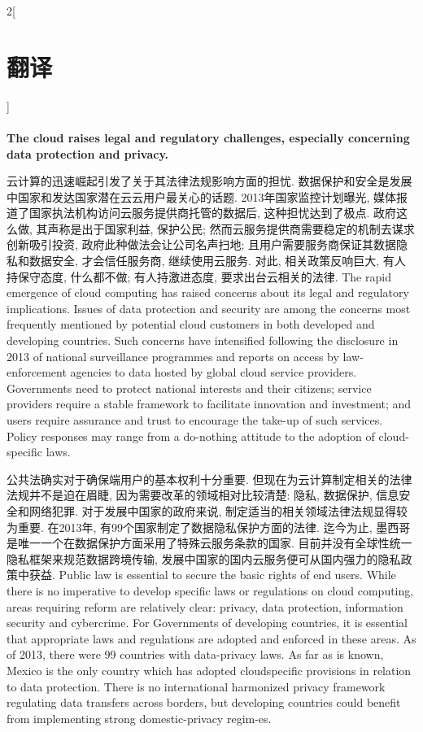 \documentclass[a4paper, UTF8, 12pt]{article}
\begin{document}
\begin{paracol}{2}[\section{翻译}]
    \paragraph{}
    {\bfseries The cloud raises legal and regulatory challenges, especially concerning data protection and privacy.}

    \switchcolumn*
    云计算的迅速崛起引发了关于其法律法规影响方面的担忧. 数据保护和安全是发展中国家和发达国家潜在云云用户最关心的话题. 2013年国家监控计划曝光, 媒体报道了国家执法机构访问云服务提供商托管的数据后, 这种担忧达到了极点. 政府这么做, 其声称是出于国家利益, 保护公民; 然而云服务提供商需要稳定的机制去谋求创新吸引投资, 政府此种做法会让公司名声扫地; 且用户需要服务商保证其数据隐私和数据安全, 才会信任服务商, 继续使用云服务. 对此, 相关政策反响巨大, 有人持保守态度, 什么都不做; 有人持激进态度, 要求出台云相关的法律.
    \switchcolumn
    \hypertarget{par:02}{}
    The rapid emergence of cloud computing has raised concerns about its legal and regulatory implications. Issues of data protection and security are among the concerns most frequently mentioned by potential cloud customers in both developed and developing countries. Such concerns have intensified following the disclosure in 2013 of national surveillance programmes and reports on access by law-enforcement agencies to data hosted by global cloud service providers. Governments need to protect national interests and their citizens; service providers require a stable framework to facilitate innovation and investment; and users require assurance and trust to encourage the take-up of such services. Policy responses may range from a do-nothing attitude to the adoption of cloud-specific laws. 

    \switchcolumn*
    公共法确实对于确保端用户的基本权利十分重要. 但现在为云计算制定相关的法律法规并不是迫在眉睫, 因为需要改革的领域相对比较清楚: 隐私, 数据保护, 信息安全和网络犯罪. 对于发展中国家的政府来说, 制定适当的相关领域法律法规显得较为重要. 在2013年, 有99个国家制定了数据隐私保护方面的法律. 迄今为止, 墨西哥是唯一一个在数据保护方面采用了特殊云服务条款的国家. 目前并没有全球性统一隐私框架来规范数据跨境传输, 发展中国家的国内云服务便可从国内强力的隐私政策中获益.
    \switchcolumn
    \hypertarget{par:03}{}
    Public law is essential to secure the basic rights of end users. While there is no imperative to develop specific laws or regulations on cloud computing, areas requiring reform are relatively clear: privacy, data protection, information security and cybercrime. For Governments of developing countries, it is essential that appropriate laws and regulations are adopted and enforced in these areas. As of 2013, there were 99 countries with data-privacy laws. As far as is known, Mexico is the only country which has adopted cloudspecific provisions in relation to data protection. There is no international harmonized privacy framework regulating data transfers across borders, but developing countries could benefit from implementing strong domestic-privacy regim-es.


\end{paracol}
\end{document}
